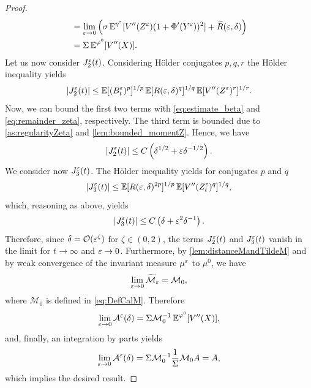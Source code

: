 \documentclass[review,onefignum,onetabnum]{siamonline190516}
\begin{document}
\begin{proof}
\begin{equation}
\begin{aligned}
	&= \lim_{\varepsilon \to 0} \left(\sigma \operatorname{\mathbb{E}}^{\eta^\varepsilon} [V''(Z^\varepsilon) (1 + \Phi'(Y^\varepsilon))^2] + \widetilde R(\varepsilon,\delta)\right)\\
	&= \Sigma \operatorname{\mathbb{E}}^{\varphi^0} [V''(X)].
	\end{aligned}
	\end{equation}
	Let us now consider $J_2^\varepsilon(t)$. Considering Hölder conjugates $p,q,r$ the Hölder inequality yields
	\begin{equation}
		\left\lvert J_2^\varepsilon(t)\right\rvert \leq \operatorname{\mathbb{E}}[(B_t^\varepsilon)^p]^{1/p}\operatorname{\mathbb{E}}[R(\varepsilon,\delta)^q]^{1/q}\operatorname{\mathbb{E}}[V''(Z^\varepsilon)^r]^{1/r}.
	\end{equation}
	Now, we can bound the first two terms with \eqref{eq:estimate_beta} and \eqref{eq:remainder_zeta}, respectively. The third term is bounded due to \cref{as:regularityZeta} and \cref{lem:bounded_momentZ}. Hence, we have
	\begin{equation}
		\left\lvert J_2^\varepsilon(t)\right\rvert \le C \left( \delta^{1/2} + \varepsilon \delta^{-1/2} \right).
	\end{equation}
	We consider now $J_3^\varepsilon(t)$. The Hölder inequality yields for conjugates $p$ and $q$
	\begin{equation}
		\left\lvert J_3^\varepsilon(t)\right\rvert \le \operatorname{\mathbb{E}}[R(\varepsilon, \delta)^{2p}]^{1/p} \operatorname{\mathbb{E}}[V''(Z_t^\varepsilon)^q]^{1/q},
	\end{equation}
	which, reasoning as above, yields
	\begin{equation}
		\left\lvert J_3^\varepsilon(t)\right\rvert \le C \left( \delta + \varepsilon^2 \delta^{-1} \right).
	\end{equation}
	Therefore, since $\delta = \mathcal O(\varepsilon^\zeta)$ for $\zeta \in (0, 2)$, the terms $J_2^\varepsilon(t)$ and $J_3^\varepsilon(t)$ vanish in the limit for $t \to \infty$ and $\varepsilon \to 0$. Furthermore, by \cref{lem:distanceMandTildeM} and by weak convergence of the invariant measure $\mu^\varepsilon$ to $\mu^0$, we have
	\begin{equation}
	\lim_{\varepsilon \to 0} \widetilde{\mathcal M}_\varepsilon = \mathcal M_0,
	\end{equation}
	where $\mathcal M_0$ is defined in \eqref{eq:DefCalM}. Therefore
	\begin{equation}
	\lim_{\varepsilon \to 0} \mathcal A^\varepsilon(\delta) = \Sigma \mathcal M_0^{-1} \operatorname{\mathbb{E}}^{\varphi^0} [V''(X)],
	\end{equation}
	and, finally, an integration by parts yields
	\begin{equation}
	\lim_{\varepsilon \to 0} \mathcal A^\varepsilon(\delta) = \Sigma \mathcal M_0^{-1} \frac1\Sigma \mathcal M_0 A = A,
	\end{equation}
	which implies the desired result.
\end{proof}
\end{document}
